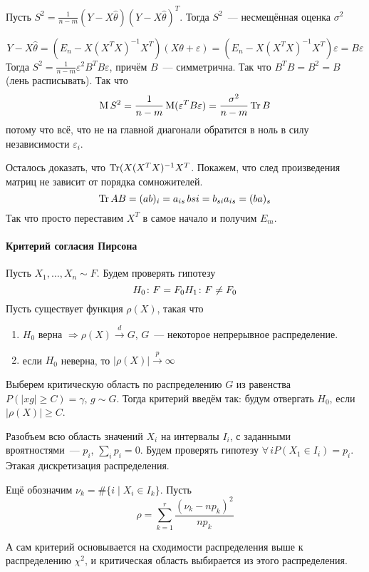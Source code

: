 \documentclass[12pt,timbord]{../../../notes}
\begin{document}
\begin{thrm}\label{thrm:stat::estdispLSM::est}
  Пусть $\displaystyle S^2 = \frac{1}{n-m} (Y - X \hat \theta) ( Y - X \hat\theta)^T$. Тогда
  $S^2$~--- несмещённая оценка $\sigma^2$
\end{thrm}
\begin{ittproof}
  \[
    Y - X\hat\theta = (E_n - X (X^T X)^{-1} X^T ) (X\theta + \varepsilon) = (E_n - X (X^T X)^{-1} X^T
    ) \varepsilon = B \varepsilon
  \]
  Тогда $S^2 = \frac{1}{n-m} \varepsilon^2 B^T B \varepsilon$, причём $B$~--- симметрична. Так
  что $B^TB =B^2 = B$ (лень расписывать). Так что 
  \[
    \operatorname{M} S^2 = \frac{1}{n-m} \operatorname{M} (\varepsilon^T B \varepsilon)  = \frac{\sigma^2}{n-m} \operatorname{Tr} B
  \]
  потому что всё, что не на главной диагонали обратится в ноль в силу независимости
  $\varepsilon_i$.

  Осталось доказать, что $\operatorname{Tr} (X (X^T X)^{-1} X^T$. Покажем, что след произведения матриц не
  зависит от порядка сомножителей. 
  \[
    \operatorname{Tr} AB = (ab)_i =  a_{is}\, b{si} = b_{si} a_{is} = (ba)_s
  \]
  Так что просто переставим $X^T$ в самое начало и получим $E_m$.
\end{ittproof}

\paragraph{Критерий согласия Пирсона}
\label{par:stat::pirson}

\begin{defn}\label{defn:stat::pirson}
  Пусть $X_1, \dotsc, X_n \sim F$. Будем проверять гипотезу \[
  H_0\colon F = F_0 \\
  H_1\colon F \neq F_0
\]
Пусть существует функция $\rho(X)$, такая что
\begin{enumerate}
  \item $H_0$ верна $ \Rightarrow \rho(X) \xrightarrow{d} G$, $G$~--- некоторое непрерывное
    распределение.
  \item если $H_0$ неверна, то $|\rho(X)| \xrightarrow{p} \infty$
\end{enumerate}

Выберем критическую область по распределению $G$ из равенства $P(|x
g| \geqslant C) = \gamma$, $g \sim G$.
Тогда критерий введём так: будум отвергать $H_0$, если $|\rho(X)| \geqslant C$. 
\end{defn}


\begin{defn}\label{defn:stat::pirson::crit}
  Разобъем всю область значений $X_i$ на интервалы $I_i$,
  с заданными вроятностями~--- $p_i$, $\sum_i p_i = 0$.
  Будем проверять гипотезу $\forall\, i P(X_1 \in I_i) = p_i$. Этакая дискретизация распределения.

  Ещё обозначим $\nu_k = \# \{i \mid X_i \in I_k\}$. Пусть
  \[
    \rho = \sum_{k=1}^r \frac{( \nu_k - np_k )^2}{n p_k} 
  \]

  А сам критерий основывается на сходимости распределения выше к распределению $\chi^2$, и
  критическая область выбирается из этого распределения.
\end{defn}
\end{document}
